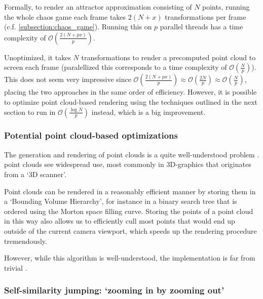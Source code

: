 \documentclass[11pt]{article}
\begin{document}
Formally, to render an attractor approximation consisting of \(N\) points, 
running the whole chaos game each frame takes \(2(N+x)\) transformations per frame (c.f. \autoref{subsection:chaos_game}). 
Running this on \(p\) parallel threads has a time complexity of \(\mathcal{O}(\frac{2(N+px)}{p})\).

Unoptimized, it takes \(N\) transformations to render a precomputed point cloud to screen each frame 
(paralellized this corresponds to a time complexity of \(\mathcal{O}(\frac{N}{p})\)).
This does not seem very impressive since \(\mathcal{O}(\frac{2(N+px)}{p}) \approx \mathcal{O}(\frac{2N}{p}) \approx \mathcal{O}(\frac{N}{p})\),
placing the two approaches in the same order of efficiency. However, it is possible to optimize point cloud-based rendering using the techniques outlined in the next section
to run in \(\mathcal{O}(\frac{\log{N}}{p})\) instead, which is a big improvement.

\subsubsection{Potential point cloud-based optimizations}
\label{sec:orga5c59ef}
\label{subsection:point_cloud_optimizations}

The generation and rendering of point clouds is a quite well-understood problem \cite{wimmer2006instant}. point clouds see widespread use,
most commonly in 3D-graphics that originates from a `3D scanner'.

Point clouds can be rendered in a reasonably efficient manner by storing them in a `Bounding Volume Hierarchy',
for instance in a binary search tree that is ordered using the Morton space filling curve. \cite{lauterbach2009construction}
Storing the points of a point cloud in this way also allows us to efficiently cull most points that would end up outside of the current camera viewport,
which speeds up the rendering procedure tremendously.

However, while this algorithm is well-understood, the implementation is far from trivial \cite{lauterbach2009construction}.

\subsubsection{Self-similarity jumping: `zooming in by zooming out'}
\label{sec:orgf039e0d}
\label{subsection:self_similarity}
\end{document}
